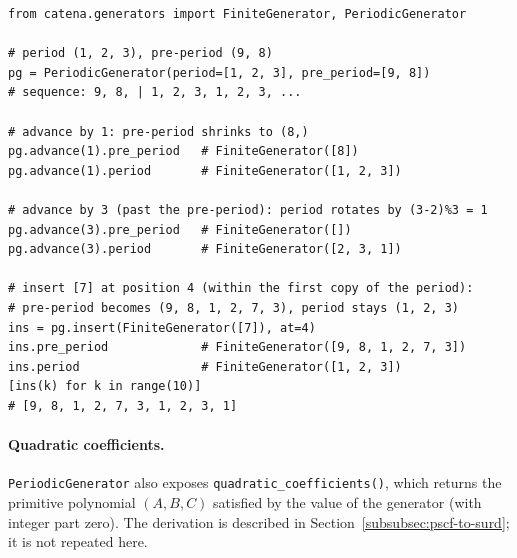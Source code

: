 \begin{catenadef}
\begin{lstlisting}[style=python]
from catena.generators import FiniteGenerator, PeriodicGenerator

# period (1, 2, 3), pre-period (9, 8)
pg = PeriodicGenerator(period=[1, 2, 3], pre_period=[9, 8])
# sequence: 9, 8, | 1, 2, 3, 1, 2, 3, ...

# advance by 1: pre-period shrinks to (8,)
pg.advance(1).pre_period   # FiniteGenerator([8])
pg.advance(1).period       # FiniteGenerator([1, 2, 3])

# advance by 3 (past the pre-period): period rotates by (3-2)%3 = 1
pg.advance(3).pre_period   # FiniteGenerator([])
pg.advance(3).period       # FiniteGenerator([2, 3, 1])

# insert [7] at position 4 (within the first copy of the period):
# pre-period becomes (9, 8, 1, 2, 7, 3), period stays (1, 2, 3)
ins = pg.insert(FiniteGenerator([7]), at=4)
ins.pre_period             # FiniteGenerator([9, 8, 1, 2, 7, 3])
ins.period                 # FiniteGenerator([1, 2, 3])
[ins(k) for k in range(10)]
# [9, 8, 1, 2, 7, 3, 1, 2, 3, 1]
\end{lstlisting}
\end{catenadef}

\paragraph{Quadratic coefficients.}
\texttt{PeriodicGenerator} also exposes
\texttt{quadratic\_coefficients()}, which returns the primitive polynomial
$(A, B, C)$ satisfied by the value of the generator (with integer part
zero).  The derivation is described in
Section~\ref{subsubsec:pscf-to-surd}; it is not repeated here.
